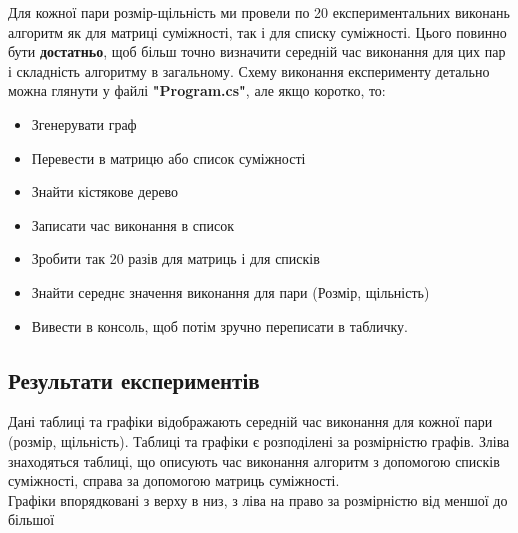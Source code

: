 \documentclass[12pt, letterpaper, twoside]{article}
\begin{document}
Для кожної пари розмір-щільність ми провели по 20 експериментальних виконань алгоритм як для матриці суміжності, так і для списку суміжності. Цього повинно бути \textbf{достатньо}, щоб більш точно визначити середній час виконання для цих пар і складність алгоритму в загальному. Схему виконання експерименту детально можна глянути у файлі \textbf{"Program.cs"}, але якщо коротко, то:
\begin{itemize}
	\item Згенерувати граф
	\item Перевести в матрицю або список суміжності
	\item Знайти кістякове дерево
	\item Записати час виконання в список
	\item Зробити так 20 разів для матриць і для списків
	\item Знайти середнє значення виконання для пари (Розмір, щільність)
	\item Вивести в консоль, щоб потім зручно переписати в табличку.
\end{itemize}

\subsection{Результати експериментів}

Дані таблиці та графіки відображають середній час виконання для кожної пари (розмір, щільність).
Таблиці та графіки є розподілені за розмірністю графів. Зліва знаходяться таблиці, що описують час виконання алгоритм з допомогою списків суміжності, справа за допомогою матриць суміжності. \\
Графіки впорядковані з верху в низ, з ліва на право за розмірністю від меншої до більшої \\
\end{document}
